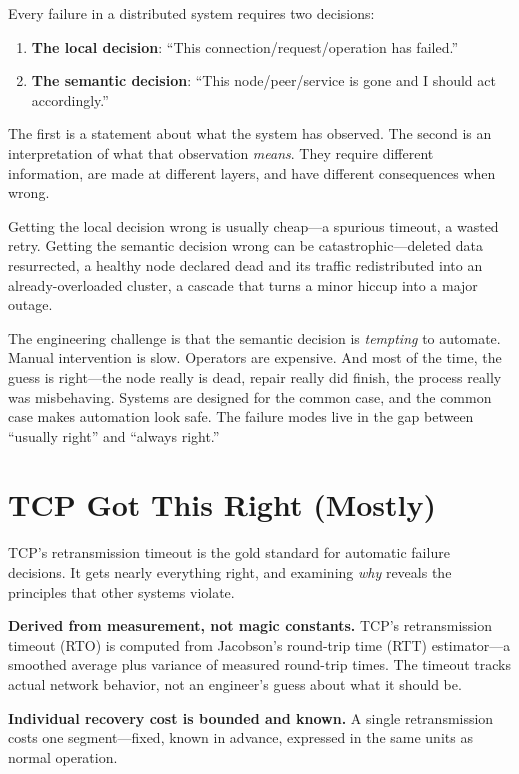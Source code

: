 \documentclass[11pt]{article}
\begin{document}
Every failure in a distributed system requires two decisions:

\begin{enumerate}
  \item \textbf{The local decision}: ``This connection/request/operation has
    failed.''
  \item \textbf{The semantic decision}: ``This node/peer/service is gone and I
    should act accordingly.''
\end{enumerate}

The first is a statement about what the system has observed. The second is an
interpretation of what that observation \emph{means}. They require different
information, are made at different layers, and have different consequences when
wrong.

Getting the local decision wrong is usually cheap---a spurious timeout, a wasted
retry. Getting the semantic decision wrong can be catastrophic---deleted data
resurrected, a healthy node declared dead and its traffic redistributed into an
already-overloaded cluster, a cascade that turns a minor hiccup into a major
outage.

The engineering challenge is that the semantic decision is \emph{tempting} to
automate. Manual intervention is slow. Operators are expensive. And most of the
time, the guess is right---the node really is dead, repair really did finish,
the process really was misbehaving. Systems are designed for the common case,
and the common case makes automation look safe. The failure modes live in the gap
between ``usually right'' and ``always right.''

\section{TCP Got This Right (Mostly)}

TCP's retransmission timeout is the gold standard for automatic failure
decisions. It gets nearly everything right, and examining \emph{why} reveals the
principles that other systems violate.

\textbf{Derived from measurement, not magic constants.} TCP's retransmission
timeout (RTO) is computed from Jacobson's round-trip time (RTT) estimator---a
smoothed average plus variance of measured round-trip times. The timeout tracks
actual network behavior, not an engineer's guess about what it should be.

\textbf{Individual recovery cost is bounded and known.} A single retransmission
costs one segment---fixed, known in advance, expressed in the same units as
normal operation.
\end{document}

